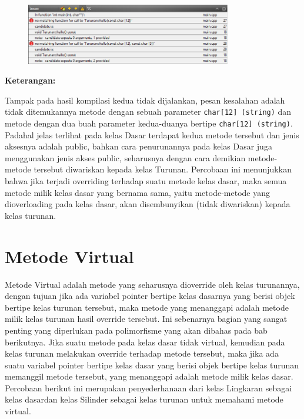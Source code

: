 \begin{figure}[htbp]
\centering
\includegraphics[width=0.8\textwidth]{images/capture7-5.png}

\end{figure}

\textbf{Keterangan:}

Tampak pada hasil kompilasi kedua tidak dijalankan, pesan kesalahan
adalah tidak ditemukannya metode dengan sebuah parameter
\texttt{char{[}12{]}\ (string)} dan metode dengan dua buah parameter
kedua-duanya bertipe \texttt{char{[}12{]}\ (string)}. Padahal jelas
terlihat pada kelas Dasar terdapat kedua metode tersebut dan jenis
aksesnya adalah public, bahkan cara penurunannya pada kelas Dasar juga
menggunakan jenis akses public, seharusnya dengan cara demikian
metode-metode tersebut diwariskan kepada kelas Turunan. Percobaan ini
menunjukkan bahwa jika terjadi overriding terhadap suatu metode kelas
dasar, maka semua metode milik kelas dasar yang bernama sama, yaitu
metode-metode yang dioverloading pada kelas dasar, akan disembunyikan
(tidak diwariskan) kepada kelas turunan.

\section{Metode Virtual}\label{metode-virtual}

Metode Virtual adalah metode yang seharusnya dioverride oleh kelas
turunannya, dengan tujuan jika ada variabel pointer bertipe kelas
dasarnya yang berisi objek bertipe kelas turunan tersebut, maka metode
yang menanggapi adalah metode milik kelas turunan hasil override
tersebut. Ini sebenarnya bagian yang sangat penting yang diperlukan pada
polimorfisme yang akan dibahas pada bab berikutnya. Jika suatu metode
pada kelas dasar tidak virtual, kemudian pada kelas turunan melakukan
override terhadap metode tersebut, maka jika ada suatu variabel pointer
bertipe kelas dasar yang berisi objek bertipe kelas turunan memanggil
metode tersebut, yang menanggapi adalah metode milik kelas dasar.
Percobaan berikut ini merupakan penyederhanaan dari kelas Lingkaran
sebagai kelas dasardan kelas Silinder sebagai kelas turunan untuk
memahami metode virtual.

